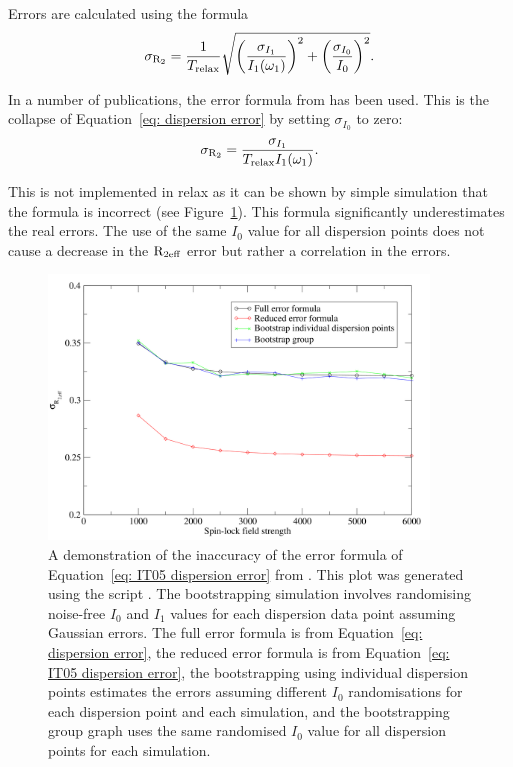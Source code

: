 Errors are calculated using the formula
\begin{equation} \label{eq: dispersion error}
    \sigma_{\mathrm{R}_2} = \frac{1}{T_\textrm{relax}} \sqrt{ \left( \frac{\sigma_{I_1}}{I_1(\omega_1)} \right)^2  +  \left( \frac{\sigma_{I_0}}{I_0} \right)^2 } .
\end{equation}

In a number of publications, the error formula from \citet{IshimaTorchia05} has been used.  This is the collapse of Equation~\ref{eq: dispersion error} by setting $\sigma_{I_0}$ to zero:
\begin{equation} \label{eq: IT05 dispersion error}
    \sigma_{\mathrm{R}_2} = \frac{\sigma_{I_1}}{T_\textrm{relax} I_1(\omega_1)} .
\end{equation}

This is not implemented in relax as it can be shown by simple simulation that the formula is incorrect (see Figure~\ref{fig: dispersion error comparison}).  This formula significantly underestimates the real errors.  The use of the same $I_0$ value for all dispersion points does not cause a decrease in the $\mathrm{R}_\textrm{2eff}$ error but rather a correlation in the errors.

\begin{figure}[h]
\centerline{\includegraphics[width=0.9\textwidth, bb=14 14 728 512]{graphics/analyses/dispersion/error_comparison}}
\caption[Comparison of relaxation dispersion errors]{A demonstration of the inaccuracy of the error formula of Equation~\ref{eq: IT05 dispersion error} from \citet{IshimaTorchia05}.  This plot was generated using the script .  The bootstrapping simulation involves randomising noise-free $I_0$ and $I_1$ values for each dispersion data point assuming Gaussian errors.  The full error formula is from Equation~\ref{eq: dispersion error}, the reduced error formula is from Equation~\ref{eq: IT05 dispersion error}, the bootstrapping using individual dispersion points estimates the errors assuming different $I_0$ randomisations for each dispersion point and each simulation, and the bootstrapping group graph uses the same randomised $I_0$ value for all dispersion points for each simulation.}
\label{fig: dispersion error comparison}
\end{figure}


